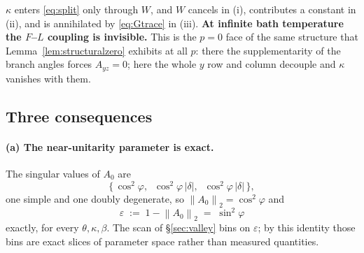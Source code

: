 \documentclass[11pt,a4paper]{article}
\theoremstyle{definition}
\theoremstyle{remark}
\newcommand{\opn}[1]{\left\lVert #1 \right\rVert_{2}}
\begin{document}
$\kappa$ enters \eqref{eq:split} only through $W$, and $W$ cancels in (i), contributes a constant in (ii), and is annihilated by \eqref{eq:Gtrace} in (iii). \textbf{At infinite bath temperature the $F$--$L$ coupling is invisible.} This is the $p=0$ face of the same structure that Lemma~\ref{lem:structuralzero} exhibits at all $p$: there the supplementarity of the branch angles forces $A_{yz}=0$; here the whole $y$ row and column decouple and $\kappa$ vanishes with them.

\subsection{Three consequences}\label{sec:consequences}

\paragraph{(a) The near-unitarity parameter is exact.} The singular values of $A_0$ are
\[
  \big\{\,\cos^2\varphi,\;\; \cos^2\varphi\,|\delta|,\;\; \cos^2\varphi\,|\delta|\,\big\},
\]
one simple and one doubly degenerate, so $\opn{A_0} = \cos^2\varphi$ and
\begin{equation}\label{eq:epsilon}
  \varepsilon \;:=\; 1 - \opn{A_0} \;=\; \sin^2\!\varphi
\end{equation}
exactly, for every $\theta,\kappa,\beta$. The scan of \S\ref{sec:valley} bins on $\varepsilon$; by this identity those bins are exact slices of parameter space rather than measured quantities.
\end{document}
